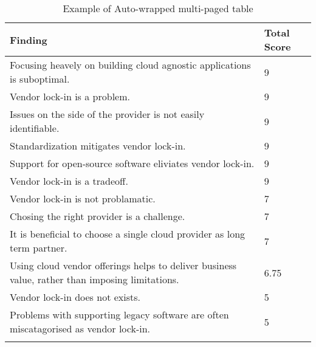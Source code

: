 
\renewcommand\arraystretch{1.5}%
\begin{longtable}{|p{10cm}|p{2cm}|}
\hline
\textbf{Finding}  & \textbf{Total Score} \\ \hline
\endhead
Focusing heavely on building cloud agnostic applications is suboptimal. & 9 \\ \hline
Vendor lock-in is a problem. & 9 \\ \hline
Issues on the side of the provider is not easily identifiable. & 9 \\ \hline
Standardization mitigates vendor lock-in. & 9 \\ \hline
Support for open-source software eliviates vendor lock-in. & 9 \\ \hline
Vendor lock-in is a tradeoff. & 9 \\ \hline
Vendor lock-in is not problamatic. & 7 \\ \hline
Chosing the right provider is a challenge. & 7 \\ \hline
It is beneficial to choose a single cloud provider as long term partner. & 7 \\ \hline
Using cloud vendor offerings helps to deliver business value, rather than imposing limitations. & 6.75 \\ \hline
Vendor lock-in does not exists. & 5 \\ \hline
Problems with supporting legacy software are often miscatagorised as vendor lock-in. & 5 \\ \hline
\caption{Example of Auto-wrapped multi-paged table}
\label{tab:table1}
\end{longtable}

